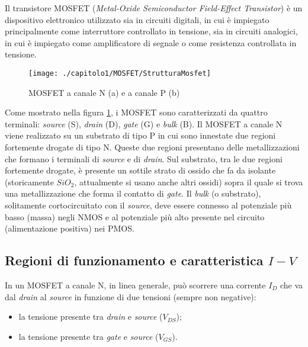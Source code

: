 Il transistore MOSFET (\emph{Metal-Oxide Semiconductor Field-Effect Transistor}) è un dispositivo elettronico utilizzato sia in circuiti digitali, in cui è impiegato principalmente come interruttore controllato in tensione, sia in circuiti analogici, in cui è impiegato come amplificatore di segnale o come resistenza controllata in tensione.\\

\begin{figure}[H]
  \centering
  \texttt{[image: ./capitolo1/MOSFET/StrutturaMosfet]}
  \caption[Struttura dei MOSFET]{MOSFET a canale N (a) e a canale P (b) \cite{transistore_MOSFET:From_MOSFET_to_FinFET_to_GAAFET}}
  \label{fig:StrutturaMosfet}
\end{figure}

Come mostrato nella figura \ref{fig:StrutturaMosfet}, i MOSFET sono caratterizzati da quattro terminali: \emph{source} (S), \emph{drain} (D), \emph{gate} (G) e \emph{bulk} (B).
Il MOSFET a canale N viene realizzato su un substrato di tipo P in cui sono innestate due regioni fortemente drogate di tipo N. Queste due regioni presentano delle metallizzazioni che formano i terminali di \emph{source} e di \emph{drain}. Sul substrato, tra le due regioni fortemente drogate, è presente un sottile strato di ossido che fa da isolante (storicamente $SiO_2$, attualmente si usano anche altri ossidi) sopra il quale si trova una metallizzazione che forma il contatto di \emph{gate}. Il \emph{bulk} (o substrato), solitamente cortocircuitato con il \emph{source}, deve essere connesso al potenziale più basso (massa) negli NMOS e al potenziale più alto presente nel circuito (alimentazione positiva) nei PMOS. \\

\subsection{Regioni di funzionamento e caratteristica $I-V$}


In un MOSFET a canale N, in linea generale, può scorrere una corrente $I_D$ che va dal \emph{drain} al \emph{source} in funzione di due tensioni (sempre non negative): 
\begin{itemize}
  \item la tensione presente tra \emph{drain} e \emph{source} ($V_{DS}$);
  \item la tensione presente tra \emph{gate} e \emph{source} ($V_{GS}$).  
\end{itemize}

